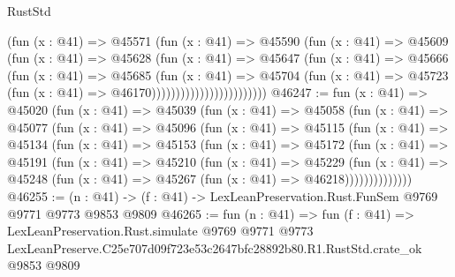 \begin{lexlean}{RustStd}
\begin{coremodule}
                                (fun (x : @41) =>
                                @45571
                                  (fun (x : @41) =>
                                  @45590
                                    (fun (x : @41) =>
                                    @45609
                                      (fun (x : @41) =>
                                      @45628
                                        (fun (x : @41) =>
                                        @45647
                                          (fun (x : @41) =>
                                          @45666
                                            (fun (x : @41) =>
                                            @45685
                                              (fun (x : @41) =>
                                              @45704
                                                (fun (x : @41) =>
                                                @45723
                                                  (fun (x : @41) => @46170))))))))))))))))))))))))
@46247 := fun (x : @41) =>
  @45020
    (fun (x : @41) =>
    @45039
      (fun (x : @41) =>
      @45058
        (fun (x : @41) =>
        @45077
          (fun (x : @41) =>
          @45096
            (fun (x : @41) =>
            @45115
              (fun (x : @41) =>
              @45134
                (fun (x : @41) =>
                @45153
                  (fun (x : @41) =>
                  @45172
                    (fun (x : @41) =>
                    @45191
                      (fun (x : @41) =>
                      @45210
                        (fun (x : @41) =>
                        @45229
                          (fun (x : @41) =>
                          @45248 (fun (x : @41) => @45267 (fun (x : @41) => @46218))))))))))))))
@46255 := (n : @41) -> (f : @41) -> LexLeanPreservation.Rust.FunSem @9769 @9771 @9773 @9853 @9809
@46265 := fun (n : @41) =>
  fun (f : @41) =>
  LexLeanPreservation.Rust.simulate
    @9769
    @9771
    @9773
    LexLeanPreserve.C25e707d09f723e53c2647bfc28892b80.R1.RustStd.crate_ok
    @9853
    @9809
\end{coremodule}
\end{lexlean}
